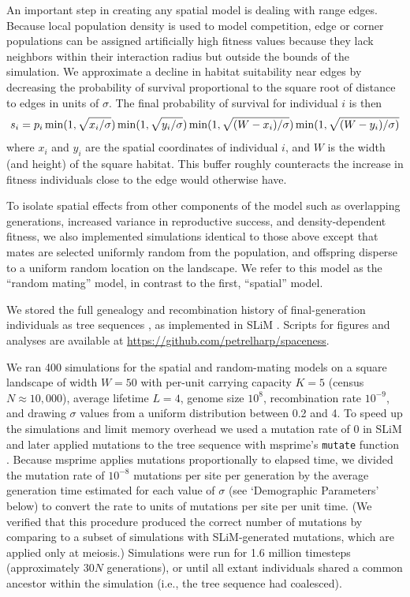 \documentclass[11pt,twoside,lineno]{preprint}
\newif\ifcomments
\newcommand{\ak}[1]{\ifcomments{{\color{red} \it (#1)}}\else{}\fi}
\begin{document}
An important step in creating any spatial model is dealing with range edges. 
Because local population density is used to model competition, edge or corner populations can be assigned artificially high fitness values 
because they lack neighbors within their interaction radius but outside the bounds of the simulation.
We approximate a decline in habitat suitability near edges by decreasing the probability of survival proportional to the square root of distance to edges in units of $\sigma$. 
The final probability of survival for individual $i$ is then
\begin{equation}
    s_{i} = p_{i} 
        \min(1,\sqrt{x_{i}/\sigma})
        \min(1,\sqrt{y_{i}/\sigma})\\
        \min(1,\sqrt{(W - x_{i})/\sigma})
        \min(1,\sqrt{(W - y_{i})/\sigma)}
\end{equation}
where $x_i$ and $y_i$ are the spatial coordinates of individual $i$, and $W$ is the width (and height) of the square habitat.
This buffer roughly counteracts the increase in fitness individuals close to the edge would otherwise have.

To isolate spatial effects from other components of the model such as overlapping generations, increased variance in reproductive success, and density-dependent fitness, 
we also implemented simulations identical to those above except that mates are selected uniformly random from the population,
and offspring disperse to a uniform random location on the landscape. 
We refer to this model as the ``random mating'' model, in contrast to the first, ``spatial'' model. 

We stored the full genealogy and recombination history of final-generation individuals as tree sequences \citep{Kelleher2018},
as implemented in SLiM \citep{haller2019treesequence}. 
Scripts for figures and analyses are available at \url{https://github.com/petrelharp/spaceness}.  

We ran 400 simulations for the spatial and random-mating models on a square landscape of width $W=50$ 
with per-unit carrying capacity $K=5$ (census $N \approx 10,000$), 
average lifetime $L=4$, 
genome size $10^{8}$, 
recombination rate $10^{-9}$, 
and drawing $\sigma$ values from a uniform distribution between 0.2 and 4. 
To speed up the simulations and limit memory overhead we used a mutation rate of 0 in SLiM 
and later applied mutations to the tree sequence with msprime's \texttt{mutate} function \citep{Kelleher2016}. 
Because msprime applies mutations proportionally to elapsed time,
we divided the mutation rate of $10^{-8}$ mutations per site per generation
by the average generation time estimated for each value of $\sigma$ (see `Demographic Parameters' below) to convert the rate to units of mutations per site per unit time.
(We verified that this procedure produced the correct number of mutations by comparing to a subset of simulations with SLiM-generated mutations, which are applied only at meiosis.)
Simulations were run for 1.6 million timesteps (approximately $30N$ generations), or until all extant individuals shared a common ancestor within the simulation (i.e., the tree sequence had coalesced). 
\ak{maybe worth including a table with some basic runtime results in the supplement?}
\end{document}
